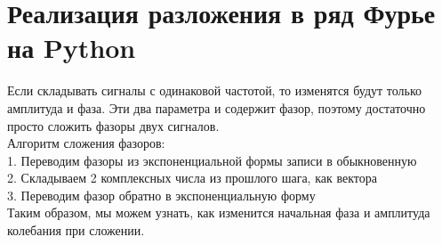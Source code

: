 \chapter{Реализация разложения в ряд Фурье на Python}
\label{ch:chap2}


Если складывать сигналы с одинаковой частотой, то изменятся будут только амплитуда и фаза. Эти два параметра и содержит фазор, поэтому
достаточно просто сложить фазоры двух сигналов.\\

Алгоритм сложения фазоров: \\

1. Переводим фазоры из экспоненциальной формы записи в обыкновенную \\
2. Складываем 2 комплексных числа из прошлого шага, как вектора \\
3. Переводим фазор обратно в экспоненциальную форму \\

Таким образом, мы можем узнать, как изменится начальная фаза и амплитуда колебания при сложении.


\endinput